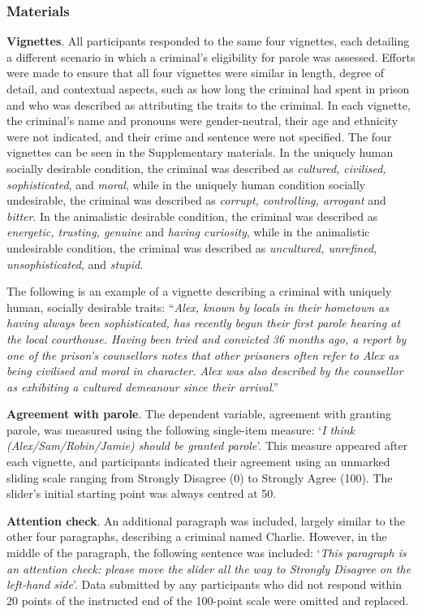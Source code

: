 \documentclass[
]{article}
\begin{document}
\hypertarget{materials-4}{%
\subsubsection{Materials}\label{materials-4}}

\textbf{Vignettes}. All participants responded to the same four vignettes, each detailing a different scenario in which a criminal's eligibility for parole was assessed. Efforts were made to ensure that all four vignettes were similar in length, degree of detail, and contextual aspects, such as how long the criminal had spent in prison and who was described as attributing the traits to the criminal. In each vignette, the criminal's name and pronouns were gender-neutral, their age and ethnicity were not indicated, and their crime and sentence were not specified. The four vignettes can be seen in the Supplementary materials. In the uniquely human socially desirable condition, the criminal was described as \emph{cultured, civilised, sophisticated}, and \emph{moral}, while in the uniquely human condition socially undesirable, the criminal was described as \emph{corrupt, controlling, arrogant} and \emph{bitter}. In the animalistic desirable condition, the criminal was described as \emph{energetic, trusting, genuine} and \emph{having curiosity}, while in the animalistic undesirable condition, the criminal was described as \emph{uncultured, unrefined, unsophisticated}, and \emph{stupid}.

The following is an example of a vignette describing a criminal with uniquely human, socially desirable traits: ``\emph{Alex, known by locals in their hometown as having always been sophisticated, has recently begun their first parole hearing at the local courthouse. Having been tried and convicted 36 months ago, a report by one of the prison's counsellors notes that other prisoners often refer to Alex as being civilised and moral in character. Alex was also described by the counsellor as exhibiting a cultured demeanour since their arrival}.''

\textbf{Agreement with parole}. The dependent variable, agreement with granting parole, was measured using the following single-item measure: `\emph{I think (Alex/Sam/Robin/Jamie) should be granted parole}'. This measure appeared after each vignette, and participants indicated their agreement using an unmarked sliding scale ranging from Strongly Disagree (0) to Strongly Agree (100). The slider's initial starting point was always centred at 50.

\textbf{Attention check}. An additional paragraph was included, largely similar to the other four paragraphs, describing a criminal named Charlie. However, in the middle of the paragraph, the following sentence was included: `\emph{This paragraph is an attention check: please move the slider all the way to Strongly Disagree on the left-hand side}'. Data submitted by any participants who did not respond within 20 points of the instructed end of the 100-point scale were omitted and replaced.
\end{document}
